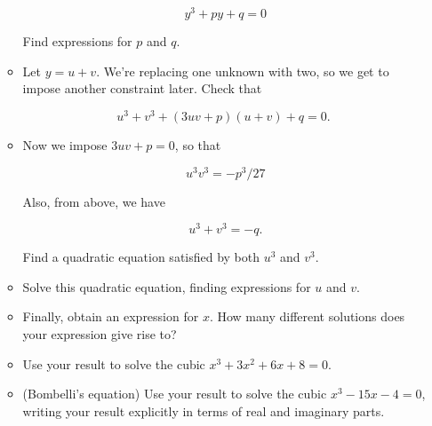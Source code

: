 \documentclass[10pt]{amsart}
\theoremstyle{nonumberplain}
\begin{document}
\begin{enumerate}[label={\bf {\arabic*}:}]
\begin{itemize}
$$
y^3+p y+q=0
$$


Find expressions for $p$ and $q$.
\item Let $y=u+v$. We're replacing one unknown with two, so we get to impose another constraint later. Check that

$$
u^3+v^3+(3 u v+p)(u+v)+q=0 \text {. }
$$

\item Now we impose $3 u v+p=0$, so that

$$
u^3 v^3=-p^3 / 27
$$


Also, from above, we have

$$
u^3+v^3=-q .
$$


Find a quadratic equation satisfied by both $u^3$ and $v^3$.
\item Solve this quadratic equation, finding expressions for $u$ and $v$.
\item Finally, obtain an expression for $x$. How many different solutions does your expression give rise to?
\item Use your result to solve the cubic $x^3+3 x^2+6 x+8=0$.
\item (Bombelli's equation) Use your result to solve the cubic $x^3-15
  x-4=0$, writing your result explicitly in terms of real and
  imaginary parts.
  \end{itemize}
\end{enumerate}
\end{document}
